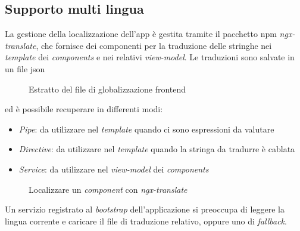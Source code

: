  \subsection{Supporto multi lingua}
 La gestione della localizzazione dell'app è gestita tramite il pacchetto \acrshort{npm} \textit{ngx-translate}, che fornisce dei componenti per la traduzione delle stringhe nei \textit{template} dei \textit{components} e nei relativi \textit{view-model}. Le traduzioni sono salvate in un file \acrshort{json}
 \begin{figure}[!h] 
	\centering    
	
	\caption[Estratto del file di globalizzazione \gls{frontend}]{Estratto del file di globalizzazione \gls{frontend}}
	\label{fig:client-globalization}
\end{figure}
ed è possibile recuperare in differenti modi:
\begin{itemize}
	\item \textit{Pipe}: da utilizzare nel \textit{template} quando ci sono espressioni da valutare
	\item \textit{Directive}: da utilizzare nel \textit{template} quando la stringa da tradurre è cablata
	\item \textit{Service}: da utilizzare nel \textit{view-model} dei \textit{components}
\end{itemize}
 \begin{figure}[!h] 
	\centering    
	
	\caption[Localizzare un \textit{component} con \textit{ngx-translate}]{Localizzare un \textit{component} con \textit{ngx-translate}}
	\label{fig:client-ngxtranslate}
\end{figure}
Un servizio registrato al \textit{bootstrap} dell'applicazione si preoccupa di leggere la lingua corrente e caricare il file di traduzione relativo, oppure uno di \textit{fallback}.